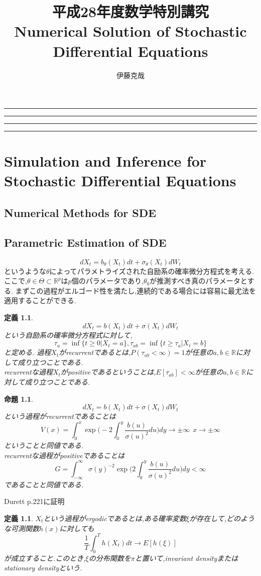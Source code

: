 \documentclass[a4paper,dvipdfmx]{jreport}
\title{平成28年度数学特別講究\\Numerical Solution of Stochastic Differential Equations}
\author{伊藤克哉}
\makeatletter
\numberwithin{equation}{section}
\newtheorem{Def}     [Thm]{定義}
\newtheorem{Prop}    [Thm]{命題}
\renewenvironment{leftbar}{%
  \def\FrameCommand{\vrule width 1pt \hspace{10pt}}%
  \MakeFramed {\advance\hsize-\width \FrameRestore}}%
 {\endMakeFramed}
\def\R{\mathbb R}
\def\prop{\begin{Prop}}
\def\propx{\end{Prop}}
\def\defb{\begin{leftbar}\begin{Def}}
\def\defx{\end{Def}\end{leftbar}}
\renewcommand{\maketitle}{\begin{titlepage}%
    \let\footnotesize\small
    \let\footnoterule\relax
    \parindent \z@
    \reset@font
    \null
    \vskip 50\p@
    \begin{center}
      \hrule height 1pt
      \vskip 2pt 
      \hrule
      \vskip 3pt
      {\huge \bfseries \strut \@title \strut}\par
      \vskip 2pt
      \hrule
      \vskip 2pt
      \hrule height 1pt
    \end{center}
    \vskip 50\p@
    \begin{flushright}
      \Large \@author \par
    \end{flushright}
    \vfil
    \null
    \begin{flushright}
        {\small \@date}%
    \end{flushright}
  \end{titlepage}%
  \setcounter{footnote}{0}%
}
\makeatother
\begin{document}
\maketitle
\tableofcontents


\chapter{Simulation and Inference for Stochastic Differential Equations}

\section{Numerical Methods for SDE}

\section{Parametric Estimation of SDE}
\[
dX_t = b_\theta (X_t) dt + \sigma_\theta(X_t) dW_t
\]
というような$\theta$によってパラメトライズされた自励系の確率微分方程式を考える.ここで,$\theta \in \Theta \subset \R^p$は$p$個のパラメータであり,$\theta_0$が推測すべき真のパラメータとする.
まずこの過程がエルゴード性を満たし,連続的である場合には容易に最尤法を適用することができる.\\
\defb
\[
dX_t = b (X_t) dt + \sigma (X_t) dW_t
\]
という自励系の確率微分方程式に対して,
\[
\tau_a = \inf \{ t\ge 0 |X_t =a \} , \tau_{ab} = \inf \{ t \ge \tau_a | X_t =b \}
\]
と定める.
過程$X_t$がrecurrentであるとは,$P(\tau_{ab} < \infty) =1$が任意の$a,b\in\R$に対して成り立つことである.\\
recurrentな過程$X_t$がpositiveであるということは,$E[\tau_{ab}] < \infty$が任意の$a,b\in\R$に対して成り立つことである.\\
\defx

\prop
\[
dX_t = b (X_t) dt + \sigma (X_t) dW_t
\]
という過程がrecurrentであることは
\[
V(x) = \int_{0}^x \exp \biggl( -2 \int_{0}^y \frac{b(u)}{\sigma(u)^2} du \biggl) dy   \to \pm\infty \ \ x\to \pm\infty
\]
ということと同値である.\\
recurrentな過程がpositiveであることは
\[
G= \int_{-\infty}^\infty \sigma(y)^{-2} \exp \biggl( 2 \int_{0}^y \frac{b(u)}{\sigma(u)^2} du \biggl) dy  < \infty
\]
であることと同値である.
\propx
Durett p.221に証明
\defb
$X_t$という過程がergodicであるとは,ある確率変数$\xi$が存在して,どのような可測関数$h(x)$に対しても
\[
\frac{1}{T} \int_0^T h(X_t) dt  \to E[h(\xi)]
\]
が成立すること.このとき,$\xi$の分布関数を$\pi$と置いて,invariant densityまたはstationary densityという.
\defx
\end{document}
